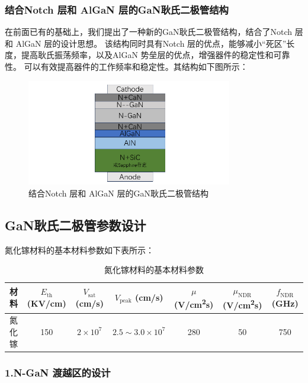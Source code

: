\documentclass[12pt,hyperref,a4paper,UTF8]{ctexart}
\begin{document}
\subsubsection{结合Notch 层和 AlGaN 层的GaN耿氏二极管结构}

在前面已有的基础上，我们提出了一种新的GaN耿氏二极管结构，结合了Notch 层和 AlGaN 层的设计思想。
该结构同时具有Notch 层的优点，能够减小“死区”长度，提高耿氏振荡频率，以及AlGaN 势垒层的优点，增强器件的稳定性和可靠性。
可以有效提高器件的工作频率和稳定性\cite{ZDWB201505001365}。其结构如下图所示：

\begin{figure}[H]
\centering
\includegraphics[width=0.8\textwidth]{figures/fig/image10.png}
\caption{结合Notch 层和 AlGaN 层的GaN耿氏二极管结构} 
\label{fig:image5}
\end{figure}

\subsection{GaN耿氏二极管参数设计}

氮化镓材料的基本材料参数如下表所示：
\begin{table}[h]
\centering
\caption{氮化镓材料的基本材料参数\cite{1011075648.nh}}
\begin{tabular}{|c|c|c|c|c|c|c|}
\hline
材料 & $E_{\text{th}}$ (KV/cm) & $V_{\text{sat}}$ (cm/s) & $V_{\text{peak}}$ (cm/s) & $\mu$ (V/cm\textsuperscript{2}s) & $\mu_{\text{NDR}}$ (V/cm\textsuperscript{2}s) & $f_{\text{NDR}}$ (GHz) \\ \hline
氮化镓 & 150 & $2 \times 10^7$ & $2.5 \sim 3.0 \times 10^7$ & 280 & 50 & 750 \\ \hline
\end{tabular}
\end{table}


\subsubsection*{1.N-GaN 渡越区的设计\cite{1011075648.nh}}
\end{document}
